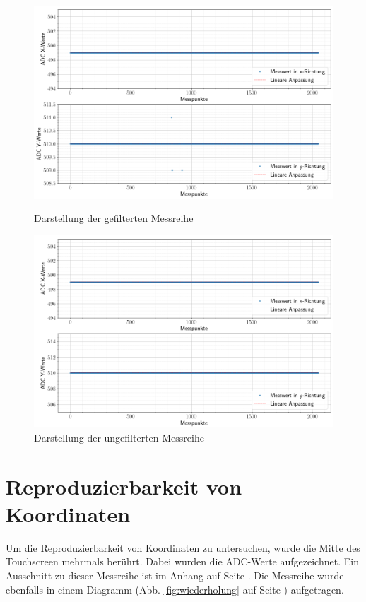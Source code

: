 \begin{figure}[ht!]
    \centering
    \includegraphics[width=\linewidth]{fig/filtered.png}
    \caption{Darstellung der gefilterten Messreihe}
    \label{fig:filtered}
    \centering
    \includegraphics[width=\linewidth]{fig/unfiltered.png}
    \caption{Darstellung der ungefilterten Messreihe}
    \label{fig:unfiltered}
\end{figure}

\newpage

\section{Reproduzierbarkeit von Koordinaten}
\label{ab:wiederholung}
Um die Reproduzierbarkeit von Koordinaten zu untersuchen, wurde die Mitte des Touchscreen mehrmals berührt. Dabei wurden die ADC-Werte aufgezeichnet.
Ein Ausschnitt zu dieser Messreihe ist im Anhang auf Seite \pageref{tab:messwiederholung}. Die Messreihe wurde ebenfalls in einem Diagramm (Abb. \ref{fig:wiederholung} auf Seite \pageref{fig:wiederholung}) aufgetragen.

